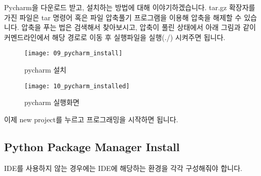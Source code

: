 \documentclass[11pt,fleqn]{book} %
\begin{document}
Pycharm을 다운로드 받고, 설치하는 방법에 대해 이야기하겠습니다. tar.gz 확장자를 가진 파일은 tar 명령어 혹은 파일 압축풀기 프로그램을 이용해 압축을 해제할 수 있습니다.
압축을 푸는 법은 검색해서 찾아보시고, 압축이 풀린 상태에서 아래 그림과 같이 커멘드라인에서 해당 경로로 이동 후 실행파일을 실행(./) 시켜주면 됩니다.

\begin{figure}[h]
\centering\texttt{[image: 09\_pycharm\_install]}
\caption{pycharm 설치}
\end{figure}

\begin{figure}[h]
\centering\texttt{[image: 10\_pycharm\_installed]}
\caption{pycharm 실행화면}
\end{figure}

이제 new project를 누르고 프로그래밍을 시작하면 됩니다.

\subsection{Python Package Manager Install}

IDE를 사용하지 않는 경우에는 IDE에 해당하는 환경을 각각 구성해줘야 합니다.


\end{document}
